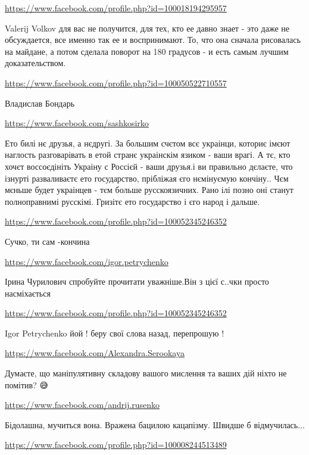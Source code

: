 \documentclass[a4paper,11pt]{extreport}
\begin{document}
\begin{itemize}
\begin{itemize}
\url{https://www.facebook.com/profile.php?id=100018194295957}

Valerij Volkov для вас не получится, для тех, кто ее давно знает - это даже не обсуждается, все именно так ее и воспринимают. То, что она сначала рисовалась на майдане, а потом сделала поворот на 180 градусов - и есть самым лучшим доказательством.

\url{https://www.facebook.com/profile.php?id=100050522710557}

Владислав Бондарь

\end{itemize}
\url{https://www.facebook.com/sashkosirko}

Ето билі нє друзья, а нєдругі. За большим счєтом всє украінци, коториє імєют наглость разговарівать в етой странє украінскім язиком - ваши врагі. А тє, кто хочєт воссоєдініть Украіну с Россієй - ваши друзья.і ви правильно дєлаєте, что ізнурті разваливаєтє ето государство, прібліжая єго нємінуємую кончіну.. Чєм мєньше будет украінцев - тєм больше русскоязичних. Рано ілі позно оні станут полноправнимі русскімі. Гризітє ето государство і єго народ і дальше.

\begin{itemize}
\url{https://www.facebook.com/profile.php?id=100052345246352}

Сучко, ти сам -кончина

\url{https://www.facebook.com/igor.petrychenko}

Ірина Чурилович спробуйте прочитати уважніше.Він з цієї с..чки просто насміхається

\url{https://www.facebook.com/profile.php?id=100052345246352}

Igor Petrychenko йой ! беру свої слова назад, перепрошую !

\end{itemize}
\url{https://www.facebook.com/Alexandra.Serookaya}

Думаєте, що маніпулятивну складову вашого мислення та ваших дій ніхто не помітив? 😅

\url{https://www.facebook.com/andrij.rusenko}

Бідолашна, мучиться вона.
Вражена бацилою кацапізму. Швидше б відмучилась...

\url{https://www.facebook.com/profile.php?id=100008244513489}


\end{itemize}
\end{document}
